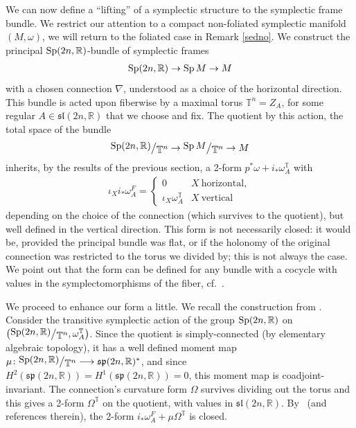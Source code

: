 \documentclass[10pt,a4paper]{amsart}
\numberwithin{equation}{section}
\newcommand{\bigslant}[2]{{\raisebox{.2em}{$#1$}\big/\raisebox{-.2em}{$#2$}}}
\begin{document}
We can now define a ``lifting'' of a symplectic structure to the symplectic frame bundle. We restrict our attention to a compact non-foliated symplectic manifold $(M,\omega)$, we will return to the foliated case in Remark \ref{sedno}. We construct the principal ${\rm Sp}(2n,\mathbb{R})$-bundle of symplectic frames
\begin{gather*}
{\rm Sp}(2n,\mathbb{R}) \to \operatorname{Sp} M \to M
\end{gather*}
with a chosen connection $\nabla$, understood as a choice of the horizontal direction. This bundle is acted upon fiberwise by a maximal torus $\mathbb{T}^n=Z_A$, for some regular $A\in\mathfrak{sl}(2n,\mathbb{R})$ that we choose and fix. The quotient by this action, the total space of the bundle
\begin{gather*}
\bigslant{{\rm Sp}(2n,\mathbb{R})}{\mathbb{T}^n} \to \bigslant{\operatorname{Sp} M}{\mathbb{T}^n} \to M
\end{gather*}
inherits, by the results of the previous section, a 2-form $p^*\omega+i_*\omega^{\mathbb{T}}_A$ with
\begin{gather*}
\iota_X i_*\omega^F_A=\begin{cases} 0 & X \ \text{horizontal},\\
\iota_X\omega^{\mathbb{T}}_A & X \ \text{vertical}\end{cases}
\end{gather*}
depending on the choice of the connection (which survives to the quotient), but well defined in the vertical direction. This form is not necessarily closed: it would be, provided the principal bundle was flat, or if the holonomy of the original connection was restricted to the torus we divided by; this is not always the case. We point out that the form can be defined for any bundle with a cocycle with values in the symplectomorphisms of the fiber, cf.~\cite{dusa}.

We proceed to enhance our form a little. We recall the construction from \cite{fat}. Consider the transitive symplectic action of the group ${\rm Sp}(2n,\mathbb{R})$ on $\big(\bigslant{{\rm Sp}(2n,\mathbb{R})}{\mathbb{T}^n},\omega^{\mathbb{T}}_A\big)$. Since the quotient is simply-connected (by elementary algebraic topology), it has a well defined moment map $\mu\colon \bigslant{{\rm Sp}(2n,\mathbb{R})}{\mathbb{T}^n}\longrightarrow \mathfrak{sp}(2n,\mathbb{R})^*$, and since $H^2(\mathfrak{sp}(2n,\mathbb{R}))=H^1(\mathfrak{sp}(2n,\mathbb{R}))=0$, this moment map is coadjoint-invariant. The connection's curvature form $\Omega$ survives dividing out the torus and this gives a 2-form $\Omega^{\mathbb{T}}$ on the quotient, with values in $\mathfrak{sl}(2n,\mathbb{R})$. By~\cite{fat} (and references therein), the 2-form $i_*\omega^F_A + \mu\Omega^{\mathbb{T}}$ is closed.
\end{document}
